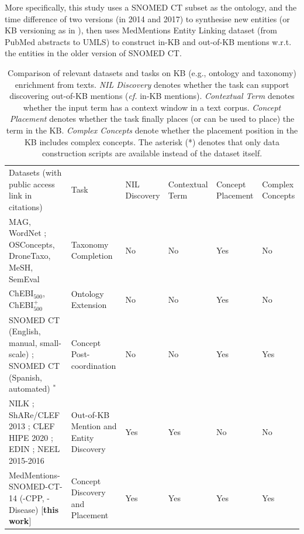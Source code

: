 \documentclass[sigconf]{acmart}
\begin{document}
More specifically, this study uses a SNOMED CT subset as the ontology, and the time difference of two versions (in 2014 and 2017) to synthesise new entities (or KB versioning as in \cite{dong2023NIL}), then uses MedMentions Entity Linking dataset \cite{Mohan2019medmentions} (from PubMed abstracts to UMLS) to construct in-KB and out-of-KB mentions w.r.t. the entities in the older version of SNOMED CT. 

\begin{table}[ht]
\small
\caption{Comparison of relevant datasets and tasks on KB (e.g., ontology and taxonomy) enrichment from texts. \textit{NIL Discovery} denotes whether the task can support discovering out-of-KB mentions (\textit{cf.} in-KB mentions). \textit{Contextual Term} denotes whether the input term has a context window in a text corpus. \textit{Concept Placement} denotes whether the task finally places (or can be used to place) the term in the KB. \textit{Complex Concepts} denote whether the placement position in the KB includes complex concepts. The asterisk (*) denotes that only data construction scripts are available instead of the dataset itself. }\label{dataset-summary}
\vspace{-0.2cm}
\begin{tabular}{p{5.2cm}p{2.4cm}|llll}
\cline{1-6}
Datasets (with public access link in citations) & Task                & NIL Discovery & Contextual Term  & Concept Placement  & Complex Concepts \\
\cline{1-6}
MAG, WordNet
\cite{zhang2021TMN,Shen2020TaxoExpan,jurgens-pilehvar-2016-semeval}; OSConcepts, DroneTaxo, MeSH, SemEval
\cite{Zeng2021,Wang2022QEN}                     & Taxonomy Completion                              & No                 & No                & Yes & No                  \\ 
\cline{1-6}
ChEBI$_{500}$, ChEBI$^+_{500}$ \cite{glauer2022interpretable} & Ontology Extension
& No                 & No & Yes & No                  \\ 
\cline{1-6}
SNOMED CT (English, manual, small-scale) \cite{kate2020}; SNOMED CT (Spanish, automated) \cite{castell2023postcoordination}$^*$                     & Concept Post-coordination                        &   No                 & No   & Yes               & Yes                  \\ 
\cline{1-6}
NILK \cite{Iurshina2022nilk}; ShARe/CLEF 2013 \cite{suominen2013shareclef}; CLEF HIPE 2020 \cite{ehrmann2020extended}; EDIN \cite{kassner2022edin}; NEEL 2015-2016 \cite{rizzo2015neel,rizzo2016neel}
                    & Out-of-KB Mention and Entity Discovery &   Yes              & Yes  & No                & No                   \\ 
\hline\hline 
MedMentions-SNOMED-CT-14 (-CPP, -Disease) [\textbf{this work}]                     & Concept Discovery and Placement                             &  Yes                & Yes               & Yes  & Yes                
 \\
\cline{1-6}
\end{tabular}
\end{table}
\end{document}
